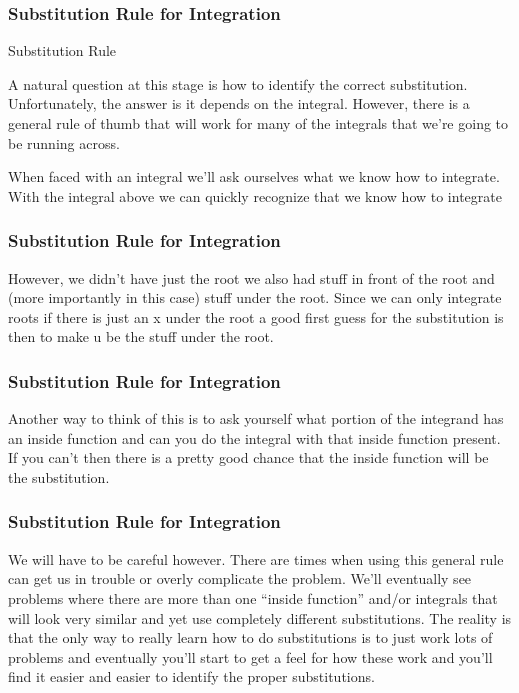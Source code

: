 \documentclass{beamer}
\begin{document}
\begin{frame}
	\frametitle{Substitution Rule for Integration}
	\large
	
Substitution Rule
                             
 
A natural question at this stage is how to identify the correct substitution.  Unfortunately, the answer is it depends on the integral.  However, there is a general rule of thumb that will work for many of the integrals that we’re going to be running across.
 
When faced with an integral we’ll ask ourselves what we know how to integrate.  With the integral above we can quickly recognize that we know how to integrate
\end{frame}
\begin{frame}
	\frametitle{Substitution Rule for Integration}
	\large
	
However, we didn’t have just the root we also had stuff in front of the root and (more importantly in this case) stuff under the root.  Since we can only integrate roots if there is just an x under the root a good first guess for the substitution is then to make u be the stuff under the root. 
\end{frame}
\begin{frame}
	\frametitle{Substitution Rule for Integration}
	\large
	
Another way to think of this is to ask yourself what portion of the integrand has an inside function and can you do the integral with that inside function present.  If you can’t then there is a pretty good chance that the inside function will be the substitution.
\end{frame}
\begin{frame}
	\frametitle{Substitution Rule for Integration}
	\large
	
 
We will have to be careful however.  There are times when using this general rule can get us in trouble or overly complicate the problem.  We’ll eventually see problems where there are more than one “inside function” and/or integrals that will look very similar and yet use completely different substitutions.  The reality is that the only way to really learn how to do substitutions is to just work lots of problems and eventually you’ll start to get a feel for how these work and you’ll find it easier and easier to identify the proper substitutions.
\end{frame}
\end{document}
